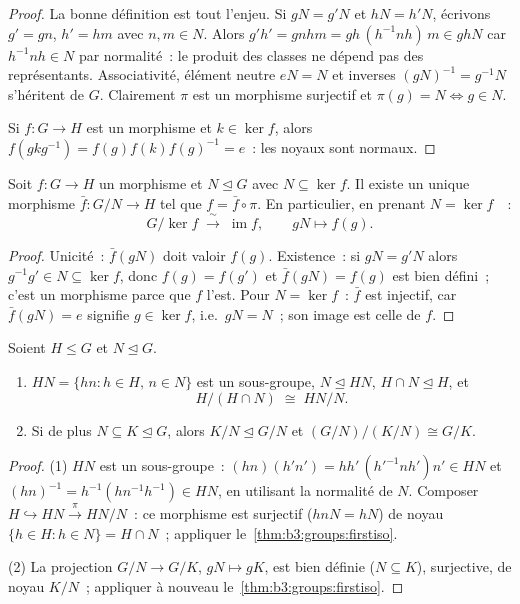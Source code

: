\begin{proof}
La bonne définition est tout l'enjeu. Si $gN = g'N$ et $hN = h'N$,
écrivons $g' = gn$, $h' = hm$ avec $n, m \in N$. Alors $g'h' =
gnhm = gh\,(h^{-1}nh)\,m \in ghN$ car $h^{-1}nh \in N$ par
normalité~: le produit des classes ne dépend pas des
représentants. Associativité, élément neutre $eN = N$ et inverses
$(gN)^{-1} = g^{-1}N$ s'héritent de $G$. Clairement $\pi$ est un
morphisme surjectif et $\pi(g) = N \iff g \in N$.

Si $f \colon G \to H$ est un morphisme et $k \in \ker f$, alors
$f(gkg^{-1}) = f(g)f(k)f(g)^{-1} = e$~: les noyaux sont normaux.
\end{proof}

\begin{theorem}
\label{thm:b3:groups:firstiso}
Soit $f \colon G \to H$ un morphisme et $N \trianglelefteq G$ avec
$N \subseteq \ker f$. Il existe un unique morphisme $\bar f \colon
G/N \to H$ tel que $f = \bar f \circ \pi$. En particulier, en
prenant $N = \ker f$~~:
\[
G/\ker f \;\xrightarrow{\;\sim\;}\; \operatorname{im} f,
\qquad gN \mapsto f(g).
\]
\end{theorem}

\begin{proof}
Unicité~: $\bar f(gN)$ doit valoir $f(g)$. Existence~: si $gN =
g'N$ alors $g^{-1}g' \in N \subseteq \ker f$, donc $f(g) = f(g')$
et $\bar f(gN) = f(g)$ est bien défini~; c'est un morphisme parce
que $f$ l'est. Pour $N = \ker f$~: $\bar f$ est injectif, car
$\bar f(gN) = e$ signifie $g \in \ker f$, i.e.\ $gN = N$~; son
image est celle de $f$.
\end{proof}

\begin{theorem}
\label{thm:b3:groups:secondiso}
Soient $H \leq G$ et $N \trianglelefteq G$.
\begin{enumerate}
  \item $HN = \{hn : h \in H,\, n \in N\}$ est un sous-groupe, $N
        \trianglelefteq HN$, $H \cap N \trianglelefteq H$, et
        \[
        H/(H \cap N) \;\cong\; HN/N .
        \]
  \item Si de plus $N \subseteq K \trianglelefteq G$, alors $K/N
        \trianglelefteq G/N$ et $(G/N)\big/(K/N) \cong G/K$.
\end{enumerate}
\end{theorem}

\begin{proof}
(1) $HN$ est un sous-groupe~: $(hn)(h'n') = hh'\,(h'^{-1}nh')n'
\in HN$ et $(hn)^{-1} = h^{-1}(hn^{-1}h^{-1}) \in HN$, en utilisant
la normalité de $N$. Composer $H \hookrightarrow HN
\xrightarrow{\pi} HN/N$~: ce morphisme est surjectif ($hnN = hN$)
de noyau $\{h \in H : h \in N\} = H \cap N$~; appliquer
le~\cref{thm:b3:groups:firstiso}.

(2) La projection $G/N \to G/K$, $gN \mapsto gK$, est bien définie
($N \subseteq K$), surjective, de noyau $K/N$~; appliquer à nouveau
le~\cref{thm:b3:groups:firstiso}.
\end{proof}


